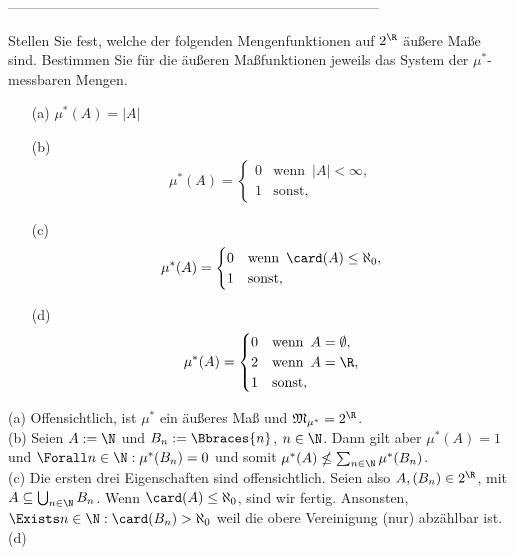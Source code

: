 --------------------------------------------------------------------------------

\begin{exercise}

Stellen Sie fest, welche der folgenden Mengenfunktionen auf $2^\R$ äußere Maße sind. Bestimmen Sie für die äußeren Maßfunktionen jeweils das System der $\mu^\ast$-messbaren Mengen.

\begin{itemize}
  \item[(a)] $\mu^\ast(A) = |A|$
  \item[(b)]
  \begin{align*}
    \mu^\ast(A) =
    \begin{cases}
      0 & \text{wenn} \enspace |A| < \infty, \\
      1 & \text{sonst},
    \end{cases}
  \end{align*}
  \item[(c)]
  \begin{align*}
    \mu^\ast(A) =
    \begin{cases}
      0 & \text{wenn} \enspace \card(A) \leq \aleph_0, \\
      1 & \text{sonst},
    \end{cases}
  \end{align*}
  \item[(d)]
  \begin{align*}
    \mu^\ast(A) =
    \begin{cases}
      0 & \text{wenn} \enspace A = \emptyset, \\
      2 & \text{wenn} \enspace A = \R, \\
      1 & \text{sonst},
    \end{cases}
  \end{align*}
\end{itemize}

\end{exercise}

\begin{solution}

(a) Offensichtlich, ist $\mu^\ast$ ein äußeres Maß und $\mathfrak{M}_{\mu^\ast} = 2^\R$. \\

(b) Seien $A := \N$ und $B_n := \Bbraces{n}$, $n \in \N$. Dann gilt aber $\mu^\ast(A) = 1$ und $\Forall n \in \N: \mu^\ast(B_n) = 0$ und somit $\mu^\ast(A) \nleq \sum_{n \in \N} \mu^\ast(B_n)$. \\

(c) Die ersten drei Eigenschaften sind offensichtlich. Seien also $A, (B_n) \in 2^\R$, mit $A \subseteq \bigcup_{n \in \N} B_n$. Wenn $\card(A) \leq \aleph_0$, sind wir fertig. Ansonsten, $\Exists n \in \N: \card(B_n) > \aleph_0$ weil die obere Vereinigung (nur) abzählbar ist. \\

(d)

\end{solution}

